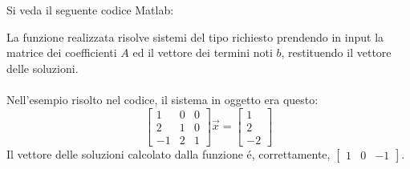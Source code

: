 \begin{center}
\footnotesize\noindent{}\end{center}

\noindent Si veda il seguente codice Matlab:



\noindent La funzione realizzata risolve sistemi del tipo richiesto prendendo in input la matrice dei coefficienti \(A\) ed il vettore dei termini noti \(b\), restituendo il vettore delle soluzioni.
\\
\\
\noindent Nell'esempio risolto nel codice, il sistema in oggetto era questo:
\[
\begin{bmatrix}1 & 0 & 0 \\ 2 & 1 & 0\\ -1 & 2 & 1 \end{bmatrix} \vec{x} = \begin{bmatrix}1 \\ 2 \\ -2 \end{bmatrix}
\]
\noindent Il vettore delle soluzioni calcolato dalla funzione \'e, correttamente, \(\begin{bmatrix}1 & 0 & -1 \end{bmatrix}\).
